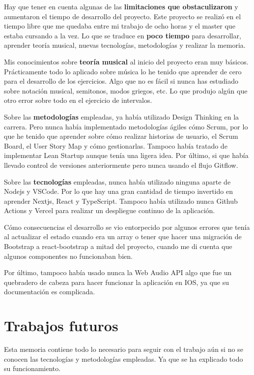 \documentclass[12pt,twoside,titlepage]{report}
\begin{document}
{Hay que tener en cuenta algunas de las \textbf{limitaciones que obstaculizaron} y aumentaron el tiempo de desarrollo del proyecto. Este proyecto se realizó en el tiempo libre que me quedaba entre mi trabajo de ocho horas y el master que estaba cursando a la vez. Lo que se traduce en \textbf{poco tiempo} para desarrollar, aprender teoría musical, nuevas tecnologías, metodologías y realizar la memoria. 

Mis conocimientos sobre \textbf{teoría musical} al inicio del proyecto eran muy básicos. Prácticamente todo lo aplicado sobre música lo he tenido que aprender de cero para el desarrollo de los ejercicios. Algo que no es fácil si nunca has estudiado sobre notación musical, semitonos, modos griegos, etc. Lo que produjo algún que otro error sobre todo en el ejercicio de intervalos.

Sobre las \textbf{metodologías} empleadas, ya había utilizado Design Thinking en la carrera. Pero nunca había implementado metodologías ágiles cómo Scrum, por lo que he tenido que aprender sobre cómo realizar historias de usuario, el Scrum Board, el User Story Map y cómo gestionarlas. Tampoco había tratado de implementar Lean Startup aunque tenía una ligera idea. Por último, si que había llevado control de versiones anteriormente pero nunca usando el flujo Gitflow.

Sobre las \textbf{tecnologías} empleadas, nunca había utilizado ninguna aparte de Nodejs y VSCode. Por lo que hay una gran cantidad de tiempo invertido en aprender Nextjs, React y TypeScript. Tampoco había utilizado nunca Github Actions y Vercel para realizar un despliegue continuo de la aplicación. 

Cómo consecuencias el desarrollo se vio entorpecido por algunos errores que tenía al actualizar el estado cuando era un array o tener que hacer una migración de Bootstrap a react-bootstrap a mitad del proyecto, cuando me di cuenta que algunos componentes no funcionaban bien. 

Por último, tampoco había usado nunca la Web Audio API algo que fue un quebradero de cabeza para hacer funcionar la aplicación en IOS, ya que su documentación es complicada.

\section{Trabajos futuros}

Esta memoria contiene todo lo necesario para seguir con el trabajo aún si no se conocen las tecnologías y metodologías empleadas. Ya que se ha explicado todo su funcionamiento.

}
\end{document}
